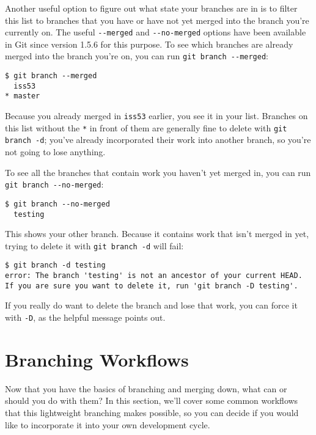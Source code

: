 \documentclass[a4paper]{book}
\begin{document}
Another useful option to figure out what state your branches are in is to filter this list to branches that you have or have not yet merged into the branch you're currently on. The useful \texttt{-{}-merged} and \texttt{-{}-no-merged} options have been available in Git since version 1.5.6 for this purpose. To see which branches are already merged into the branch you're on, you can run \texttt{git branch -{}-merged}:

\begin{shaded}\begin{verbatim}
$ git branch --merged
  iss53
* master
\end{verbatim}\end{shaded}

Because you already merged in \texttt{iss53} earlier, you see it in your list. Branches on this list without the \texttt{*} in front of them are generally fine to delete with \texttt{git branch -d}; you've already incorporated their work into another branch, so you're not going to lose anything.

To see all the branches that contain work you haven't yet merged in, you can run \texttt{git branch -{}-no-merged}:

\begin{shaded}\begin{verbatim}
$ git branch --no-merged
  testing
\end{verbatim}\end{shaded}

This shows your other branch. Because it contains work that isn't merged in yet, trying to delete it with \texttt{git branch -d} will fail:

\begin{shaded}\begin{verbatim}
$ git branch -d testing
error: The branch 'testing' is not an ancestor of your current HEAD.
If you are sure you want to delete it, run 'git branch -D testing'.
\end{verbatim}\end{shaded}

If you really do want to delete the branch and lose that work, you can force it with \texttt{-D}, as the helpful message points out.

\section{Branching Workflows}

Now that you have the basics of branching and merging down, what can or should you do with them? In this section, we'll cover some common workflows that this lightweight branching makes possible, so you can decide if you would like to incorporate it into your own development cycle.
\end{document}
